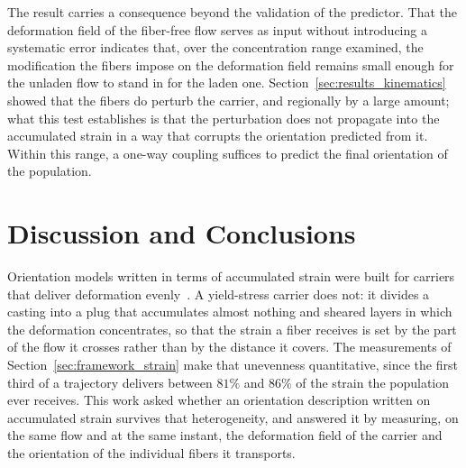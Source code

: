 \documentclass[%
  aip,
  pof,          %
  reprint,      %
  floatfix
]{revtex4-2}
\begin{document}
The result carries a consequence beyond the validation of the predictor. That the deformation field of the fiber-free flow serves as input without introducing a systematic error indicates that, over the concentration range examined, the modification the fibers impose on the deformation field remains small enough for the unladen flow to stand in for the laden one. Section~\ref{sec:results_kinematics} showed that the fibers do perturb the carrier, and regionally by a large amount; what this test establishes is that the perturbation does not propagate into the accumulated strain in a way that corrupts the orientation predicted from it. Within this range, a one-way coupling suffices to predict the final orientation of the population.

\section{Discussion and Conclusions}
\label{sec:conclusions}

Orientation models written in terms of accumulated strain were built for carriers that deliver deformation evenly~\cite{folgar1984orientation,advani1987use,eberle2010kinetics}. A yield-stress carrier does not: it divides a casting into a plug that accumulates almost nothing and sheared layers in which the deformation concentrates, so that the strain a fiber receives is set by the part of the flow it crosses rather than by the distance it covers. The measurements of Section~\ref{sec:framework_strain} make that unevenness quantitative, since the first third of a trajectory delivers between $81\%$ and $86\%$ of the strain the population ever receives. This work asked whether an orientation description written on accumulated strain survives that heterogeneity, and answered it by measuring, on the same flow and at the same instant, the deformation field of the carrier and the orientation of the individual fibers it transports.
\end{document}
